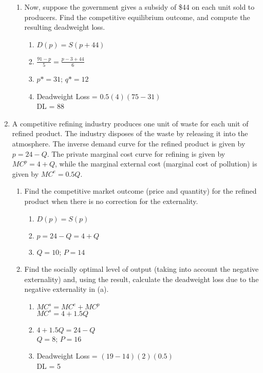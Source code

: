 \documentclass[11pt]{article}
\begin{document}
\begin{enumerate}
\begin{enumerate}
        \item Now, suppose the government gives a subsidy of \$44 on each unit sold to producers. Find the competitive equilibrium outcome, and compute the resulting deadweight loss.
        \begin{enumerate}
            \item $D(p)=S(p+44)$
            \item $\frac{91-p}{5}=\frac{p-3+44}{6}$
            \item $p* = 31$; $q* = 12$
            \item Deadweight Loss = $0.5(4)(75-31)$\\
            DL = 88
        \end{enumerate}
    \end{enumerate}
\pagebreak
\item A competitive refining industry produces one unit of waste for each unit of refined product. The industry disposes of the waste by releasing it into the atmosphere. The inverse demand curve for the refined product is given by $p=24-Q$. The private marginal cost curve for refining is given by $MC^{p}=4+Q$, while the marginal external cost (marginal cost of pollution) is given by $MC^{e}=0.5Q$.
	\begin{enumerate}
	\item Find the competitive market outcome (price and quantity) for the refined product when there is no correction for the externality.
	\begin{enumerate}
    	\item $D(p)=S(p)$
        \item $p = 24 - Q = 4 + Q$
        \item $Q = 10$; $P = 14$
    \end{enumerate}
	
    \item Find the socially optimal level of output (taking into account the negative externality) and, using the result, calculate the deadweight loss due to the negative externality in (a).
    \begin{enumerate}
        \item $MC^s = MC^e + MC^p$\\
        $MC^s = 4 + 1.5Q$
        \item $4 + 1.5Q = 24 - Q$\\
        $Q = 8$; $P = 16$
        \item Deadweight Loss = $(19-14)(2)(0.5)$\\
        DL = 5
    \end{enumerate}


\end{enumerate}
\end{enumerate}
\end{document}
